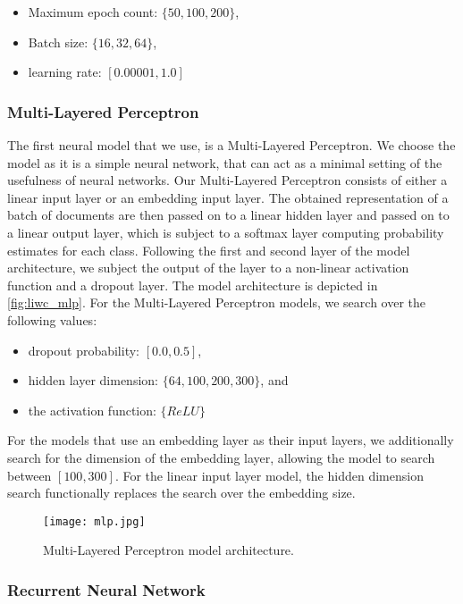 \begin{itemize}
  \item Maximum epoch count: $\{50, 100, 200\}$,
  \item Batch size: $\{16, 32, 64\}$,
  \item learning rate: $[0.00001, 1.0]$
\end{itemize}

\subsubsection{Multi-Layered Perceptron}

The first neural model that we use, is a Multi-Layered Perceptron. We choose the model as it is a simple neural network, that can act as a minimal setting of the usefulness of neural networks. Our Multi-Layered Perceptron consists of either a linear input layer or an embedding input layer. The obtained representation of a batch of documents are then passed on to a linear hidden layer and passed on to a linear output layer, which is subject to a softmax layer computing probability estimates for each class. Following the first and second layer of the model architecture, we subject the output of the layer to a non-linear activation function and a dropout layer. The model architecture is depicted in \autoref{fig:liwc_mlp}. For the Multi-Layered Perceptron models, we search over the following values:

\begin{itemize}
  \item dropout probability: $[0.0, 0.5]$,
  \item hidden layer dimension: $\{64, 100, 200, 300\}$, and
  \item the activation function: $\{ReLU\}$
\end{itemize}

For the models that use an embedding layer as their input layers, we additionally search for the dimension of the embedding layer, allowing the model to search between $[100, 300]$. For the linear input layer model, the hidden dimension search functionally replaces the search over the embedding size.

\begin{figure}
  \centering
  \texttt{[image: mlp.jpg]}
  \caption{Multi-Layered Perceptron model architecture.}
  \label{fig:liwc_mlp}
\end{figure}


\subsubsection{Recurrent Neural Network}

